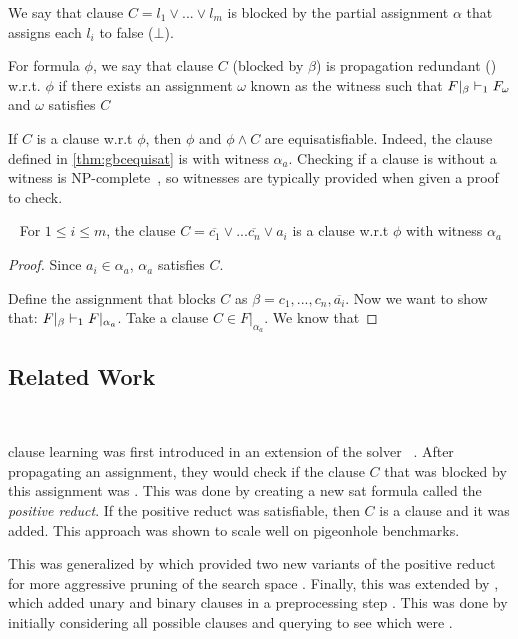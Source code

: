 
We say that clause $C = l_1 \lor ... \lor l_m$ is blocked by the partial assignment $\alpha$ that assigns each $l_i$ to false ($\bot$).

\begin{definition}
    For formula $\phi$, we say that clause $C$ (blocked by $\beta$) is propagation redundant (\pr) w.r.t. $\phi$ if there exists an assignment $\omega$ known as the witness such that $F|_\beta \vdash_1 F_\omega$ and $\omega$ satisfies $C$
\end{definition}

If $C$ is a \pr clause w.r.t $\phi$, then $\phi$ and $\phi \land C$ are equisatisfiable. Indeed, the clause defined in \autoref{thm:gbcequisat} is \pr with witness $\alpha_a$. Checking if a clause is \pr without a witness is NP-complete~\cite{prclause}, so witnesses are typically provided when given a \pr proof to check.

\begin{theorem}~\label{thm:totalassignmnet}
    For $1 \leq i \leq m$, the clause $C = \overline{c_1} \lor ... \overline{c_n} \lor a_i$ is a \pr clause w.r.t $\phi$ with witness $\alpha_a$
\end{theorem}

\begin{proof}
   Since $a_i \in \alpha_a$, $\alpha_a$ satisfies $C$.
   
   Define the assignment that blocks $C$ as $\beta = c_1, ..., c_n, \overline{a_i}$. Now we want to show that: $F|_\beta \vdash_1 F|_{\alpha_a}$. Take a clause $C \in F|_{\alpha_a}$. We know that
\end{proof}


\subsection{Related Work}~\label{subsec:relatedwork}

\pr clause learning was first introduced in an extension of the solver \lingeling~\cite{prclause}. After propagating an assignment, they would check if the clause $C$ that was blocked by this assignment was \pr. This was done by creating a new sat formula called the \emph{positive reduct}. If the positive reduct was satisfiable, then $C$ is a \pr clause and it was added. This approach was shown to scale well on pigeonhole benchmarks.

This was generalized by \sadical which provided two new variants of the positive reduct for more aggressive pruning of the search space \cite{sadical}. Finally, this was extended by \prelearn, which added unary and binary \pr clauses in a preprocessing step \cite{prelearn}. This was done by initially considering all possible clauses and querying \sadical to see which were \pr.

